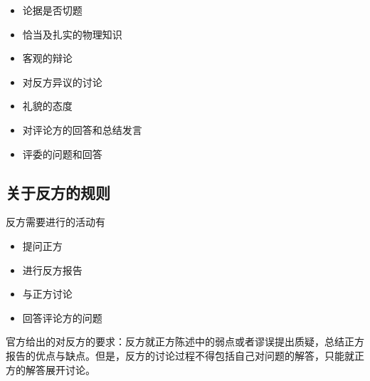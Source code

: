 \documentclass[a4paper,10pt,english]{sphinxmanual}
\begin{document}
\begin{itemize}
\begin{description}
\begin{itemize}
\item {} 
论据是否切题

\item {} 
恰当及扎实的物理知识

\item {} 
客观的辩论

\item {} 
对反方异议的讨论

\item {} 
礼貌的态度

\item {} 
对评论方的回答和总结发言

\item {} 
评委的问题和回答

\end{itemize}

\end{description}

\end{itemize}


\subsection{关于反方的规则}
\label{\detokenize{6. Tournament:id4}}
反方需要进行的活动有
\begin{itemize}
\item {} 
提问正方

\item {} 
进行反方报告

\item {} 
与正方讨论

\item {} 
回答评论方的问题

\end{itemize}

官方给出的对反方的要求：反方就正方陈述中的弱点或者谬误提出质疑，总结正方报告的优点与缺点。但是，反方的讨论过程不得包括自己对问题的解答，只能就正方的解答展开讨论。
\end{document}
